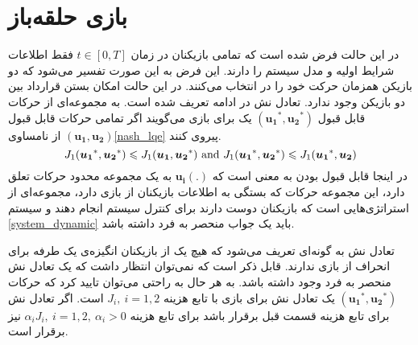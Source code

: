 \section{بازی حلقه‌باز}
در این حالت فرض شده است که تمامی بازیکنان در زمان 
$t \in [0, T]$
فقط اطلاعات شرایط اولیه و مدل سیستم را دارند. این فرض به این صورت تفسیر می‌شود که دو بازیکن همزمان حرکت خود را در انتخاب می‌کنند. در این حالت امکان بستن قرارداد بین دو بازیکن وجود ندارد. تعادل نش در ادامه تعریف شده ‌است.
به مجموعه‌ای از حرکات قابل قبول 
$(\boldsymbol{u_1}^*,  \boldsymbol{u_2}^*)$
یک  برای بازی می‌گویند اگر تمامی حرکات قابل قبول 
$(\boldsymbol{u_1},  \boldsymbol{u_2})$
از نامساوی\ref{nash_lqe} پیروی کنند.
\begin{equation}\label{nash_lqe}
	J_1(\boldsymbol{u_1}^*, \boldsymbol{u_2}^*)\leq J_1(\boldsymbol{u_1}, \boldsymbol{u_2}^*) \text{\rm{ and }}
	J_1(\boldsymbol{u_1}^*, \boldsymbol{u_2}^*)\leq 
	J_1(\boldsymbol{u_1}^*, \boldsymbol{u_2})
\end{equation}
در اینجا قابل قبول بودن به معنی است که
$\boldsymbol{u_i}(.)$
به یک مجموعه محدود حرکات تعلق دارد، این مجموعه حرکات که بستگی به اطلاعات بازیکنان از بازی دارد، مجموعه‌ای از استراتژی‌هایی است که بازیکنان دوست دارند برای کنترل سیستم انجام دهند و سیستم 
\ref{system_dynamic}
باید یک جواب منحصر به فرد داشته باشد. 


تعادل نش به گونه‌ای تعریف می‌شود که هیچ یک از بازیکنان انگیزه‌ی یک طرفه برای انحراف از بازی ندارند. قابل ذکر است که نمی‌توان انتظار داشت که یک تعادل نش منحصر به فرد وجود داشته باشد. به هر حال به راحتی می‌توان تایید کرد که حرکات
$(\boldsymbol{u_1}^*, \boldsymbol{u_2}^*)$
یک تعادل نش برای بازی با تابع هزینه
$J_i,~ i = 1, 2$
است. اگر تعادل نش برای تابع هزینه قسمت قبل برقرار باشد برای تابع هزینه
$\alpha_iJ_i,~ i = 1, 2, ~\alpha_i>0$
نیز برقرار است.


